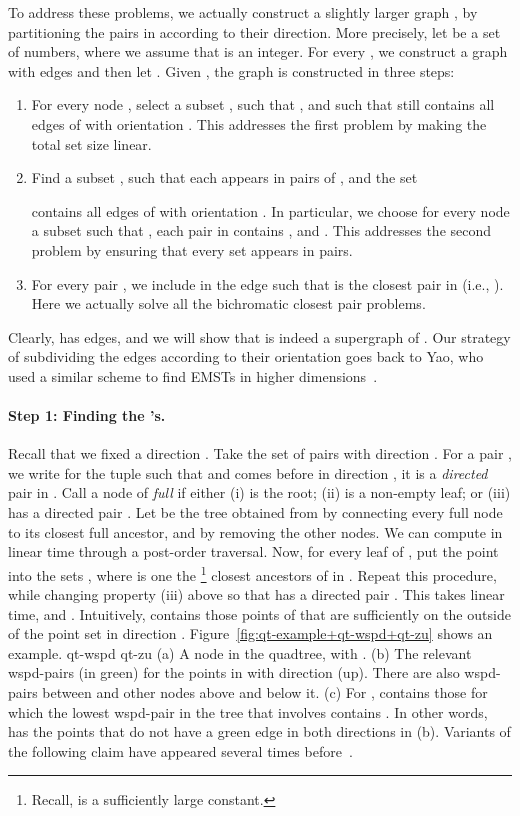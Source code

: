 \documentclass[11pt]{paper}
\begin{document}
To address these problems, we actually construct a slightly larger graph
, by partitioning the pairs in  according to their
direction. More precisely,
let  be a set of
 numbers, where we assume 
that  is an integer.
For every  , we  construct a graph 
with  edges and then let .
Given , the graph  is constructed in three steps:
\begin{enumerate}
\item 
  For every node
  , select a subset , such that
  ,
  and such that 
   still
  contains all edges of  with orientation . This addresses
  the first problem by making the total set size linear.
\item 
  Find a subset ,
  such that
  each  appears in  pairs of
  , and the set 
  
  contains all edges of  with orientation .
In particular, we choose
  for every node  a subset
   such that
  ,
  each  pair in  contains , and
  . This addresses the second problem
  by ensuring that every set appears in  pairs.
\item 
  For every pair , we
  include in  the edge  such that
   is the closest pair in  (i.e.,
  ).
  Here we actually solve all the bichromatic closest pair problems.
\end{enumerate}
Clearly,  has  edges, and we will show that  is indeed a
supergraph of . Our strategy of subdividing the edges
according to their orientation goes back to Yao, who
used a similar scheme to find EMSTs in higher dimensions~\cite{Yao82}. 

\paragraph{Step 1: Finding the 's.}
Recall that we fixed a direction .  Take the set
 of pairs with direction
. For a pair , we write 
 for the tuple such that  and  comes before
 in direction , it is a \emph{directed} pair in . 
Call a node  of  \emph{full} if either 
(i)  is the
root; (ii)  is a non-empty leaf; or (iii)  has a
directed pair . 
Let  be the tree 
obtained from  by
connecting every full node to its closest full ancestor, and by
removing the other nodes. We can compute  in linear time
through a post-order traversal.  Now, for every leaf  of , put
the point  into the sets , where  is one the \footnote
{Recall,  is a sufficiently large constant.}
closest ancestors of  in . Repeat this procedure, while changing
property (iii) above so that  has a directed pair
. 
This takes
linear time, and . Intuitively, 
contains those points of  that are sufficiently on the outside
of the point set in direction .
Figure~\ref {fig:qt-example+qt-wspd+qt-zu} shows an example.
 {qt-wspd} {qt-zu}
{(a) A node  in the quadtree, with .
 (b) The relevant wspd-pairs (in green) for the points in 
     with direction  (up). There are also wspd-pairs between  and
     other nodes above and below it.
 (c) For ,  contains those  for which the 
     lowest wspd-pair in the tree  that involves  
     contains .
     In other words,   has the points that do not have a green edge in
     both directions in (b).
}
Variants of the following claim
have appeared several times before~\cite{AgarwalEdScWe91,Yao82}.
\end{document}
